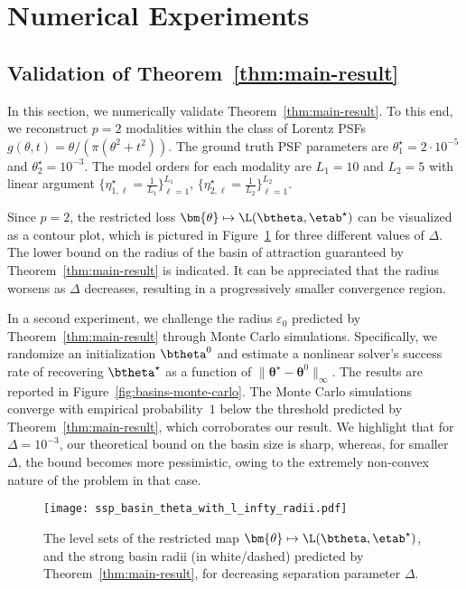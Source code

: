 \documentclass[conference,english,final,svgnames]{IEEEtran}
\begin{document}
\section{Numerical Experiments}\label{sec:simulations}

\subsection{Validation of Theorem~\ref{thm:main-result}}

In this section, we numerically validate Theorem~\ref{thm:main-result}. To this end, we reconstruct $p = 2$ modalities within the class of Lorentz PSFs $g(\theta, t) = \theta / (\pi (\theta^2 + t^2))$. The ground truth PSF parameters are $\theta^\star_1 = 2\cdot 10^{-5}$ and $\theta^\star_2 =10^{-3}$. The model orders for each modality are $L_1 = 10$ and $L_2 = 5$ with linear argument $\{\eta^\star_{1,\ell} = \tfrac{1}{L_1}\}_{\ell=1}^{L_1}$, $\{\eta^\star_{2,\ell} = \tfrac{1}{L_2}\}_{\ell=1}^{L_2}$. 

Since $p=2$, the restricted loss $\bm{\theta} \mapsto \L(\btheta, \etab^\star)$ can be visualized as a contour plot, which is pictured in Figure~\ref{fig:basins-theta} for three different values of $\Delta$. The lower bound on the radius of the basin of attraction guaranteed by Theorem~\ref{thm:main-result} is indicated. It can be appreciated that the radius worsens as $\Delta$ decreases, resulting in a progressively smaller convergence region.

In a second experiment, we challenge the radius $\varepsilon_0$ predicted by Theorem~\ref{thm:main-result} through Monte Carlo simulations. Specifically, we randomize an initialization \(\btheta^0\) and estimate a nonlinear solver's success rate of recovering $\btheta^\star$ as a function of $\|\bm{\theta}^\star - \bm{\theta}^0\|_{\infty}$. The results are reported in Figure~\ref{fig:basins-monte-carlo}. The Monte Carlo simulations converge with empirical probability~$1$ below the threshold predicted by Theorem~\ref{thm:main-result}, which corroborates our result.
We highlight that for $\Delta = 10^{-3}$, our theoretical bound on the basin size is sharp, whereas, for smaller $\Delta$, the bound becomes more pessimistic, owing to the extremely non-convex nature of the problem in that case.

\begin{figure}[t]
    \centering \texttt{[image: ssp\_basin\_theta\_with\_l\_infty\_radii.pdf]}
    \vspace{-12pt}
    \caption{The level sets of the restricted map $\bm{\theta} \mapsto \L(\btheta, \etab^\star)$, and the strong basin radii (in white/dashed) predicted by Theorem~\ref{thm:main-result}, for decreasing separation parameter $\Delta$.}
    \label{fig:basins-theta}
\end{figure}
\end{document}
